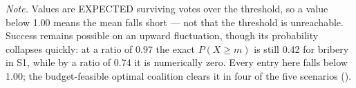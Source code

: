 \begin{table}[htbp]
\centering
\caption{Capacity of each vector at full effort, as a multiple of the manipulation threshold $m$ (baseline configuration).}
\label{tab:capacity}
\small
{}
\vspace{2pt}
{\footnotesize\textit{Note.} Values are EXPECTED surviving votes over the threshold, so a value below 1.00 means the mean falls short --- not that the threshold is unreachable. Success remains possible on an upward fluctuation, though its probability collapses quickly: at a ratio of 0.97 the exact $P(X \geq m)$ is still 0.42 for bribery in S1, while by a ratio of 0.74 it is numerically zero. Every entry here falls below 1.00; the budget-feasible optimal coalition clears it in four of the five scenarios ().}
\end{table}
